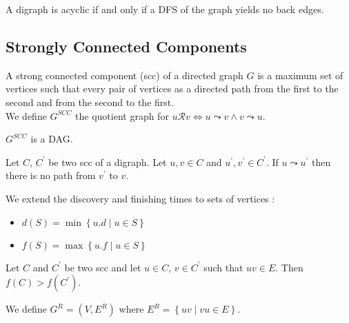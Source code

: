 \documentclass{cours}
\begin{document}
        \begin{lemma}
            A digraph is acyclic if and only if a DFS of the graph yields no back edges.
        \end{lemma}

        \subsection{Strongly Connected Components}
        \begin{definition}
            A strong connected component (scc) of a directed graph $G$ is a maximum set of vertices such that every pair of vertices as a directed path from the first to the second and from the second to the first. \\ We define $G^{SCC}$ the quotient graph for $u \mathcal{R} v \Leftrightarrow u \leadsto v \wedge v \leadsto u$.
        \end{definition}
        
        \begin{proposition}
            $G^{SCC}$ is a DAG.
        \end{proposition}

        \begin{lemma}
            Let $C$, $C^{'}$ be two scc of a digraph. Let $u, v \in C$ and $u^{'}, v^{'} \in C^{'}$. If $u \leadsto u^{'}$ then there is no path from $v^{'}$ to $v$.
        \end{lemma}

        \begin{definition}
            We extend the discovery and finishing times to sets of vertices : 
            \begin{itemize}
                \item $d(S) = \min \left\{u.d \mid u \in S\right\}$
                \item $f(S) = \max \left\{u.f \mid u \in S \right\}$
            \end{itemize}
        \end{definition}

        \begin{lemma}
            Let $C$ and $C^{'}$ be two scc and let $u \in C$, $v \in C^{'}$ such that $uv \in E$. Then $f(C) > f(C^{'})$.
        \end{lemma}

        \begin{definition}
            We define $G^{R} = \left(V, E^{R}\right)$ where $E^{R} = \left\{uv \mid vu \in E\right\}$.
        \end{definition}
\end{document}
